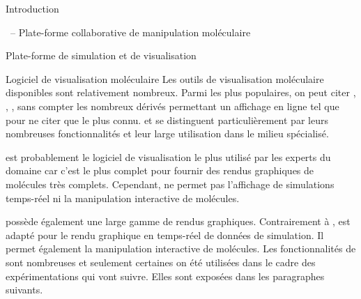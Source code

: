 \documentclass[myfrancais]{mythesis}
\begin{document}
\begin{mypart}{Introduction}
\begin{mychapter}{\myShaddock\ -- Plate-forme collaborative de manipulation moléculaire}
\begin{mysection}{Plate-forme de simulation et de visualisation}
				\begin{mysubsection}{Logiciel de visualisation moléculaire}
					Les outils de visualisation moléculaire disponibles sont relativement nombreux.
					Parmi les plus populaires, on peut citer \myPyMOL {},  , \myChimera {}, \myRasmol {} sans compter les nombreux dérivés permettant un affichage en ligne tel que \myJmol {} pour ne citer que le plus connu.
					\myPyMOL et  se distinguent particulièrement par leurs nombreuses fonctionnalités et leur large utilisation dans le milieu spécialisé.

					\myPyMOL est probablement le logiciel de visualisation le plus utilisé par les experts du domaine car c'est le plus complet pour fournir des rendus graphiques de molécules très complets.
					Cependant, \myPyMOL ne permet pas l'affichage de simulations temps-réel ni la manipulation interactive de molécules.

					 possède également une large gamme de rendus graphiques.
					Contrairement à \myPyMOL,  est adapté pour le rendu graphique en temps-réel de données de simulation.
					Il permet également la manipulation interactive de molécules.
					Les fonctionnalités de  sont nombreuses et seulement certaines on été utilisées dans le cadre des expérimentations qui vont suivre.
					Elles sont exposées dans les paragraphes suivants.


\end{mysubsection}
\end{mysection}
\end{mychapter}
\end{mypart}
\end{document}
